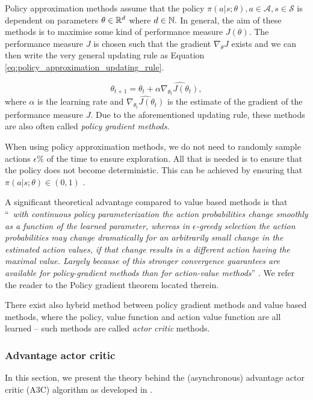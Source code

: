 Policy approximation methods assume that the policy $\pi(a|s;\theta), a \in \mathcal{A}, s \in \mathcal{S}$ is dependent on parameters $\theta \in \mathbb{R}^d$ where $d \in \mathbb{N}.$ In general, the aim of these methods is to maximise some kind of performance measure $J(\theta)$. The performance measure $J$ is chosen such that the gradient $\nabla_{\theta}J$ exists and we can then write the very general updating rule as Equation \ref{eq:policy_approximation_updating_rule}.

\begin{equation}
\label{eq:policy_approximation_updating_rule}
\theta_{t+1}=\theta_t+\alpha \widehat{\nabla_{\theta_t} J(\theta_t)},
\end{equation}
where $\alpha$ is the learning rate and $\widehat{\nabla_{\theta_t} J(\theta_t)}$ is the estimate of the gradient of the performance measure $J$. Due to the aforementioned updating rule, these methods are also often called \textit{policy gradient methods}. 

\begin{rem} 
When using policy approximation methods, we do not need to randomly sample actions $\epsilon \%$ of the time to ensure exploration. All that is needed is to ensure that the policy does not become deterministic. This can be achieved by ensuring that $\pi(a|s;\theta) \in (0,1)$ \cite[Section 13.1]{sutton2018reinforcement}.
\end{rem}

A significant theoretical advantage compared to value based methods is that “~\textit{with continuous policy parameterization the action probabilities change smoothly as a function of the learned parameter, whereas in $\epsilon$-greedy selection the action probabilities may change dramatically for an arbitrarily small change in the estimated action values, if that change results in a different action having the maximal value. Largely because of this stronger convergence guarantees are available for policy-gradient methods than for action-value methods}” \cite[Section 13.2]{sutton2018reinforcement}. We refer the reader to the Policy gradient theorem located therein.

There exist also hybrid method between policy gradient methods and value based methods, where the policy, value function and action value function are all learned -- such methods are called \textit{actor critic} methods.

\subsubsection{Advantage actor critic}
In this section, we present the theory behind the (asynchronous) advantage actor critic (A3C) algorithm as developed in \cite{a3c_paper}.

